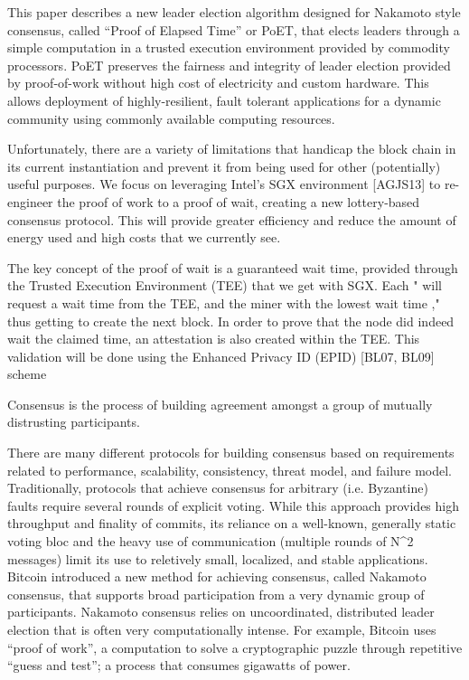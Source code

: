 This paper describes a new leader election algorithm designed for Nakamoto style consensus, called ``Proof of Elapsed
Time'' or PoET, that elects leaders through a simple computation in a trusted execution environment provided by
commodity processors. PoET preserves the fairness and integrity of leader election provided by proof-of-work without
high cost of electricity and custom hardware. This allows deployment of highly-resilient, fault tolerant applications
for a dynamic community using commonly available computing resources. 

Unfortunately, there are a variety of limitations that handicap the block chain in its current
instantiation and prevent it from being used for other (potentially) useful purposes. We focus on
leveraging Intel's SGX environment [AGJS13] to re-engineer the proof of work to a proof of wait,
creating a new lottery-based consensus protocol. This will provide greater efficiency and reduce
the amount of energy used and high costs that we currently see.

The key concept of the proof of wait is a guaranteed wait time, provided through the Trusted
Execution Environment (TEE) that we get with SGX. Each \miner" will request a wait time from
the TEE, and the miner with the lowest wait time \wins," thus getting to create the next block.
In order to prove that the node did indeed wait the claimed time, an attestation is also created
within the TEE. This validation will be done using the Enhanced Privacy ID (EPID) [BL07, BL09]
scheme


Consensus is the process of building agreement amongst a group of mutually distrusting participants. 

There are many different protocols for building consensus based on requirements related to performance, scalability,
consistency, threat model, and failure model. Traditionally, protocols that achieve consensus for arbitrary
(i.e. Byzantine) faults require several rounds of explicit voting. While this approach provides high throughput and
finality of commits, its reliance on a well-known, generally static voting bloc and the heavy use of communication
(multiple rounds of N^2 messages) limit its use to reletively small, localized, and stable applications. Bitcoin
introduced a new method for achieving consensus, called Nakamoto consensus, that supports broad participation from a
very dynamic group of participants. Nakamoto consensus relies on uncoordinated, distributed leader election that is
often very computationally intense. For example, Bitcoin uses ``proof of work'', a computation to solve a cryptographic
puzzle through repetitive ``guess and test''; a process that consumes gigawatts of power.

